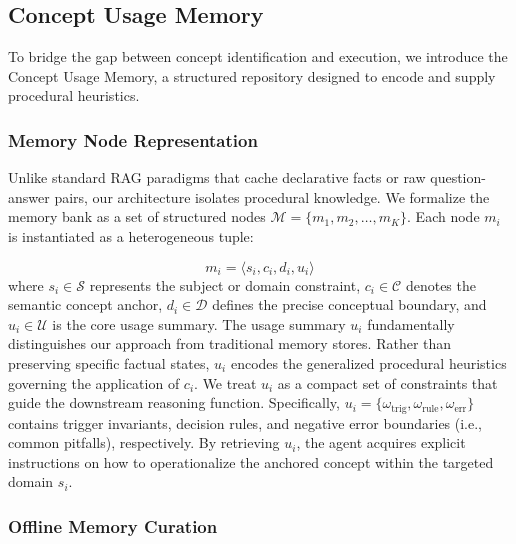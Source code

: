 \documentclass[11pt]{article}
\begin{document}
\subsection{Concept Usage Memory}
To bridge the gap between concept identification and execution, we introduce the Concept Usage Memory, a structured repository designed to encode and supply procedural heuristics.

\subsubsection{Memory Node Representation}

Unlike standard RAG paradigms that cache declarative facts or raw question-answer pairs, our architecture isolates procedural knowledge.
We formalize the memory bank as a set of structured nodes $\mathcal{M} = \{m_1, m_2, \dots, m_K\}$.
Each node $m_i$ is instantiated as a heterogeneous tuple:

\begin{equation}
    m_i = \langle s_i, c_i, d_i, u_i \rangle
\end{equation}
where $s_i \in \mathcal{S}$ represents the subject or domain constraint, $c_i \in \mathcal{C}$ denotes the semantic concept anchor, $d_i \in \mathcal{D}$ defines the precise conceptual boundary, and $u_i \in \mathcal{U}$ is the core usage summary.
The usage summary $u_i$ fundamentally distinguishes our approach from traditional memory stores.
Rather than preserving specific factual states, $u_i$ encodes the generalized procedural heuristics governing the application of $c_i$.
We treat $u_i$ as a compact set of constraints that guide the downstream reasoning function.
Specifically, $u_i = \{ \omega_{\mathrm{trig}}, \omega_{\mathrm{rule}}, \omega_{\mathrm{err}} \}$ contains trigger invariants, decision rules, and negative error boundaries (i.e., common pitfalls), respectively.
By retrieving $u_i$, the agent acquires explicit instructions on how to operationalize the anchored concept within the targeted domain $s_i$.

\subsubsection{Offline Memory Curation}
\end{document}
